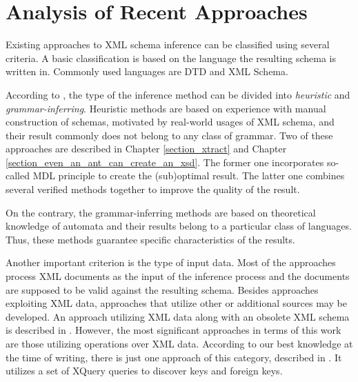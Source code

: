\chapter{Analysis of Recent Approaches} \label{chapter_analysis_of_recent_approaches}
Existing approaches to XML schema inference can be classified using several criteria. A basic classification is based on the language the resulting schema is written in. Commonly used languages are DTD and XML Schema.

According to \cite{Mlynkova:2008:AAX:1494650.1495496}, the type of the inference method can be divided into \emph{heuristic} and \emph{grammar-inferring}. Heuristic methods \cite{Chidlovskii:2002:SEX:544220.544288, Garofalakis:2000:XSE:342009.335409, Moh:2000:RSW:336597.336638, Wong03onstructural, Vosta:2008:EAC:1802514.1802522} are based on experience with manual construction of schemas, motivated by real-world usages of XML schema, and their result commonly does not belong to any class of grammar. Two of these approaches are described in Chapter \ref{section_xtract} and Chapter \ref{section_even_an_ant_can_create_an_xsd}. The former one incorporates so-called MDL principle to create the (sub)optimal result. The latter one combines several verified methods together to improve the quality of the result.

On the contrary, the grammar-inferring methods \cite{Ahonen1996GeneratingGrammars, Bex:2006:ICD:1182635.1164139, Bex:2007:IXS:1325851.1325964, Hegewald:2006:XES:1129755.1130124, Min:2003:EES:639473.639475, Fernau:2001:LXG:645744.667236} are based on theoretical knowledge of automata and their results belong to a particular class of languages. Thus, these methods guarantee specific characteristics of the results.

Another important criterion is the type of input data. Most of the approaches process XML documents as the input of the inference process and the documents are supposed to be valid against the resulting schema. Besides approaches exploiting XML data, approaches that utilize other or additional sources may be developed. An approach utilizing XML data along with an obsolete XML schema is described in \cite{Mlynkova:2009:IXS:1862681.1862693}. However, the most significant approaches in terms of this work are those utilizing operations over XML data. According to our best knowledge at the time of writing, there is just one approach of this category, described in \cite{Necasky:2009:DXK:1529282.1529414}. It utilizes a set of XQuery queries to discover keys and foreign keys.

